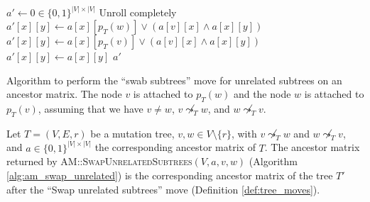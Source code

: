 \begin{algorithm}[p]
    \begin{algorithmic}[1]
        \State $a' \leftarrow 0 \in \{0,1\}^{|V| \times |V|}$
             \Comment Unroll completely
                    \State $a'[x][y] \leftarrow a[x][p_T(w)] \vee (a[v][x] \wedge a[x][y])$
                    \State $a'[x][y] \leftarrow a[x][p_T(v)] \vee (a[v][x] \wedge a[x][y])$
                \Else
                    \State $a'[x][y] \leftarrow a[x][y]$
                \EndIf
            \EndFor
        \EndFor
        \State \Return $a'$
        \EndFunction
    \end{algorithmic}
    \caption{Algorithm to perform the ``swab subtrees'' move for unrelated subtrees on an ancestor matrix. The node $v$ is attached to $p_T(w)$ and the node $w$ is attached to $p_T(v)$, assuming that we have $v \neq w$, $v \not\leadsto_T w$, and $w \not\leadsto_T v$.}
    \label{alg:am_swap_unrelated}
\end{algorithm}

\begin{theorem}
    \label{theo:swap_unrelated_correctness}
    Let $T = (V, E, r)$ be a mutation tree, $v,w \in V \setminus \{r\}$, with $v \not\leadsto_T w$ and $w \not\leadsto_T v$, and $a \in \{0,1\}^{|V| \times |V|}$ the corresponding ancestor matrix of $T$. The ancestor matrix returned by \textsc{AM::SwapUnrelatedSubtrees}$(V, a, v, w)$ (Algorithm \ref{alg:am_swap_unrelated}) is the corresponding ancestor matrix of the tree $T'$ after the ``Swap unrelated subtrees'' move (Definition \ref{def:tree_moves}).
\end{theorem}

